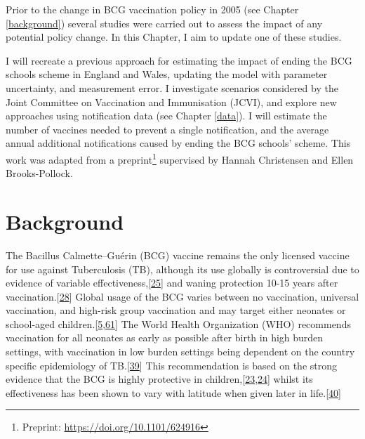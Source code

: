\documentclass[11pt,twoside]{bristolthesis}
\begin{document}
  Prior to the change in BCG vaccination policy in 2005 (see Chapter \ref{background}) several studies were carried out to assess the impact of any potential policy change. In this Chapter, I aim to update one of these studies.
  
  I will recreate a previous approach for estimating the impact of ending the BCG schools scheme in England and Wales, updating the model with parameter uncertainty, and measurement error. I investigate scenarios considered by the Joint Committee on Vaccination and Immunisation (JCVI), and explore new approaches using notification data (see Chapter \ref{data}). I will estimate the number of vaccines needed to prevent a single notification, and the average annual additional notifications caused by ending the BCG schools' scheme. This work was adapted from a preprint\footnote{Preprint: \url{https://doi.org/10.1101/624916}} supervised by Hannah Christensen and Ellen Brooks-Pollock.
  
  \hypertarget{background-3}{%
  \section{Background}\label{background-3}}
  
  The Bacillus Calmette--Guérin (BCG) vaccine remains the only licensed vaccine for use against Tuberculosis (TB), although its use globally is controversial due to evidence of variable effectiveness,{[}\protect\hyperlink{ref-Mangtani2014a}{25}{]} and waning protection 10-15 years after vaccination.{[}\protect\hyperlink{ref-Abubakar2013}{28}{]} Global usage of the BCG varies between no vaccination, universal vaccination, and high-risk group vaccination and may target either neonates or school-aged children.{[}\protect\hyperlink{ref-Zwerling2011a}{5},\protect\hyperlink{ref-Pilger2012b}{61}{]} The World Health Organization (WHO) recommends vaccination for all neonates as early as possible after birth in high burden settings, with vaccination in low burden settings being dependent on the country specific epidemiology of TB.{[}\protect\hyperlink{ref-WHO2017}{39}{]} This recommendation is based on the strong evidence that the BCG is highly protective in children,{[}\protect\hyperlink{ref-Rodrigues1993}{23},\protect\hyperlink{ref-Colditz1994}{24}{]} whilst its effectiveness has been shown to vary with latitude when given later in life.{[}\protect\hyperlink{ref-Mangtani2014}{40}{]}
  
\end{document}

